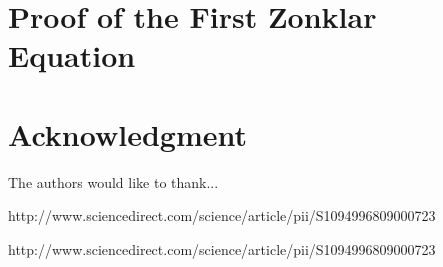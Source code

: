 \documentclass[conference]{IEEEtran}
\begin{document}
\appendices
\section{Proof of the First Zonklar Equation}
\blindtext

\section*{Acknowledgment}


The authors would like to thank...


\ifCLASSOPTIONcaptionsoff
  \newpage
\fi





%
%
%
\begin{thebibliography}{1}

http://www.sciencedirect.com/science/article/pii/S1094996809000723

http://www.sciencedirect.com/science/article/pii/S1094996809000723



\end{thebibliography}

% 
\end{document}
